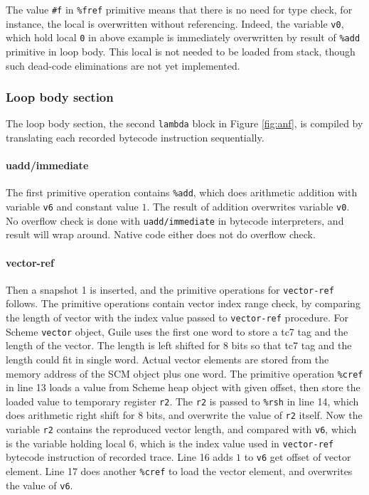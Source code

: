 \documentclass[preprint, 10pt]{sigplanconf}
\begin{document}
The value \texttt{\#f} in \texttt{\%fref} primitive means that there is no need
for type check, for instance, the local is overwritten without
referencing. Indeed, the variable \texttt{v0}, which hold local \texttt{0} in
above example is immediately overwritten by result of \texttt{\%add} primitive
in loop body. This local is not needed to be loaded from stack, though such
dead-code eliminations are not yet implemented.

\subsubsection{Loop body section}

The loop body section, the second \texttt{lambda} block in Figure
\hyperref[fig:anf]{\ref{fig:anf}}, is compiled by translating each recorded
bytecode instruction sequentially.

\paragraph{uadd/immediate} The first primitive operation contains
\texttt{\%add}, which does arithmetic addition with variable \texttt{v6} and
constant value $1$. The result of addition overwrites variable \texttt{v0}. No
overflow check is done with \texttt{uadd/immediate} in bytecode interpreters,
and result will wrap around. Native code either does not do overflow check.

\paragraph{vector-ref} Then a snapshot 1 is inserted, and
the primitive operations for \texttt{vector-ref} follows. The primitive
operations contain vector index range check, by comparing the length of vector
with the index value passed to \texttt{vector-ref} procedure. For Scheme
\texttt{vector} object, Guile uses the first one word to store a tc7 tag and the
length of the vector. The length is left shifted for 8 bits so that tc7 tag and
the length could fit in single word. Actual vector elements are stored from the
memory address of the SCM object plus one word. The primitive operation
\texttt{\%cref} in line 13 loads a value from Scheme heap object with given
offset, then store the loaded value to temporary register \texttt{r2}. The
\texttt{r2} is passed to \texttt{\%rsh} in line 14, which does arithmetic right
shift for 8 bits, and overwrite the value of \texttt{r2} itself. Now the
variable \texttt{r2} contains the reproduced vector length, and compared with
\texttt{v6}, which is the variable holding local 6, which is the index value
used in \texttt{vector-ref} bytecode instruction of recorded trace. Line 16 adds
$1$ to \texttt{v6} get offset of vector element. Line 17 does another
\texttt{\%cref} to load the vector element, and overwrites the value of
\texttt{v6}.
\end{document}
